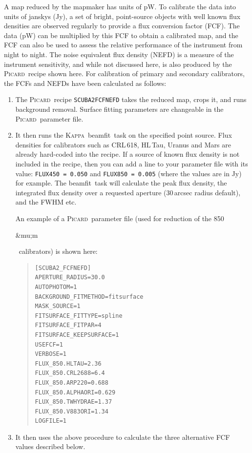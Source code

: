 \documentclass[twoside,11pt]{article}
\newcommand{\micron}{\mbox{\,${\umu}$m}}            %
\newcommand{\xref}[3]{#1}
\renewcommand{\_}{\texttt{\symbol{95}}}
\newenvironment{myquote}{\begin{quote}\begin{small}}{\end{small}\end{quote}}
\newcommand{\Kappa}{\xref{\textsc{Kappa}}{sun95}{}}
\newcommand{\picard}{\xref{\textsc{Picard}}{sun231}{}}
\newcommand{\drrecipe}[1]{\texttt{#1}}
\newcommand{\task}[1]{\textsf{#1}}
\newcommand{\beamfit}{\xref{\task{beamfit}}{sun95}{BEAMFIT}}
\renewcommand{\micron}{\begin{rawhtml}&mu;m\end{rawhtml}}
\begin{document}
A map reduced by the mapmaker has units of pW. To calibrate the data
into units of janskys (Jy), a set of bright, point-source objects with
well known flux densities are observed regularly to provide a flux
conversion factor (FCF). The data (pW) can be multiplied by this FCF
to obtain a calibrated map, and the FCF can also be used to assess the
relative performance of the instrument from night to night. The noise
equivalent flux density (NEFD) is a measure of the instrument
sensitivity, and while not discussed here, is also produced by the
\picard\ recipe shown here. For calibration of primary and secondary
calibrators, the FCFs and NEFDs have been calculated as follows:
\begin{enumerate}
\item{The \picard\ recipe \drrecipe{SCUBA2\_FCFNEFD} takes the reduced
  map, crops it, and runs background removal. Surface fitting
  parameters are changeable in the \picard\ parameter file.}
\item{It then runs the \Kappa\ \beamfit\ task on the specified point
  source. Flux densities for calibrators such as CRL\,618, HL\,Tau, Uranus
  and Mars are already hard-coded into the recipe. If a source of
  known flux density is not included in the recipe, then you can add a
  line to your parameter file with its value: \texttt{FLUX\_450 =
    0.050} and \texttt{FLUX\_850 = 0.005} (where the values are in Jy)
  for example. The \beamfit\ task will calculate the peak flux
  density, the integrated flux density over a requested aperture
  (30\,arcsec radius default), and the FWHM etc.}

  An example of a \picard\ parameter file (used for reduction of the
  850\micron\ calibrators) is shown here:

\begin{myquote}
\begin{verbatim}
[SCUBA2_FCFNEFD]
APERTURE_RADIUS=30.0
AUTOPHOTOM=1
BACKGROUND_FITMETHOD=fitsurface
MASK_SOURCE=1
FITSURFACE_FITTYPE=spline
FITSURFACE_FITPAR=4
FITSURFACE_KEEPSURFACE=1
USEFCF=1
VERBOSE=1
FLUX_850.HLTAU=2.36
FLUX_850.CRL2688=6.4
FLUX_850.ARP220=0.688
FLUX_850.ALPHAORI=0.629
FLUX_850.TWHYDRAE=1.37
FLUX_850.V883ORI=1.34
LOGFILE=1
\end{verbatim}
\end{myquote}

\item {It then uses the above procedure to calculate the three
  alternative FCF values described below.}
\end{enumerate}
\end{document}
